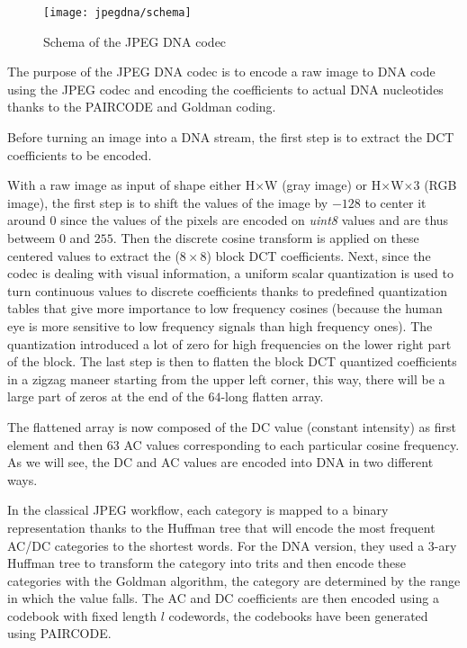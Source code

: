 \begin{figure}
    \centering
    \texttt{[image: jpegdna/schema]}
    \caption{Schema of the JPEG DNA codec}
    \label{fig:jpegdna}
\end{figure}

The purpose of the JPEG DNA codec is to encode a raw image to DNA code using the JPEG codec and encoding the coefficients to actual DNA nucleotides thanks to the PAIRCODE and Goldman coding.

Before turning an image into a DNA stream, the first step is to extract the DCT coefficients to be encoded. 

With a raw image as input of shape either H$\times$W (gray image) or H$\times$W$\times$3 (RGB image), the first step is to shift the values of the image by $-128$ to center it around $0$ since the values of the pixels are encoded on \textit{uint8} values and are thus betweem $0$ and $255$. Then the discrete cosine transform is applied on these centered values to extract the ($8\times8$) block DCT coefficients. Next, since the codec is dealing with visual information, a uniform scalar quantization is used to turn continuous values to discrete coefficients thanks to predefined quantization tables that give more importance to low frequency cosines (because the human eye is more sensitive to low frequency signals than high frequency ones).  The quantization introduced a lot of zero for high frequencies on the lower right part of the block. The last step is then to flatten the block DCT quantized coefficients in a zigzag maneer starting from the upper left corner, this way, there will be a large part of zeros at the end of the $64$-long flatten array. 

The flattened array is now composed of the DC value (constant intensity) as first element and then 63 AC values corresponding to each particular cosine frequency. As we will see, the DC and AC values are encoded into DNA in two different ways.

In the classical JPEG workflow, each category is mapped to a binary representation thanks to the Huffman tree that will encode the most frequent AC/DC categories to the shortest words. 
For the DNA version, they used a 3-ary Huffman tree to transform the category into trits and then encode these categories with the Goldman algorithm, the category are determined by the range in which the value falls.
The AC and DC coefficients are then encoded using a codebook with fixed length $l$ codewords, the codebooks have been generated using PAIRCODE.

